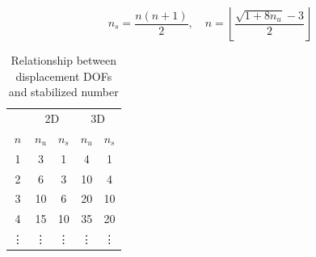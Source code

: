 \begin{equation}
n_s = \frac{n(n + 1)}{2}, \quad
n = \left\lfloor \frac{\sqrt{1 + 8n_u} - 3}{2} \right\rfloor
\end{equation}

\begin{table}[ht!]
\centering
\caption{Relationship between displacement DOFs and stabilized number}
\label{tab:constraint}
\begin{tabular}{ccccc}
\toprule
& \multicolumn{2}{c}{2D} & \multicolumn{2}{c}{3D} \\
$n$ & $n_u$ & $n_s$ & $n_u$ & $n_s$ \\
\midrule
1 & 3 & 1 & 4 & 1 \\
2 & 6 & 3 & 10 & 4 \\
3 & 10 & 6 & 20 & 10 \\
4 & 15 & 10 & 35 & 20 \\
\vdots & \vdots & \vdots & \vdots & \vdots \\
\bottomrule
\end{tabular}
\end{table}

